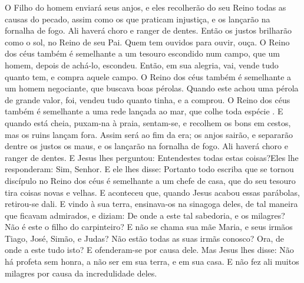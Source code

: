 {  O Filho do homem enviará seus anjos, e eles recolherão do seu Reino todas as causas do pecado,
 assim como os que praticam injustiça,
  e os lançarão na fornalha de fogo. Ali haverá choro e ranger de dentes.
  Então os justos brilharão como o sol, no Reino de seu Pai. Quem tem ouvidos para ouvir, ouça.
  O Reino dos céus também é semelhante a um tesouro escondido num campo, que um homem, depois de achá-lo, escondeu. Então, em sua alegria, vai, vende tudo quanto tem, e compra aquele campo.
  O Reino dos céus também é semelhante a um homem negociante, que buscava boas pérolas.
  Quando este achou uma pérola de grande valor, foi, vendeu tudo quanto tinha, e a comprou.
  O Reino dos céus também é semelhante a uma rede lançada ao mar, que colhe toda espécie
{} .
  E quando está cheia,
{} puxam-na à praia, sentam-se, e recolhem os bons em cestos, mas os ruins lançam fora.
  Assim será ao fim da era; os anjos sairão, e separarão dentre os justos os maus,
  e os lançarão na fornalha de fogo. Ali haverá choro e ranger de dentes.
  E Jesus lhes perguntou: Entendestes todas estas coisas?Eles lhe responderam: Sim, Senhor.
  E ele lhes disse: Portanto todo escriba que se tornou discípulo no Reino dos céus é semelhante a um chefe de casa, que do seu tesouro tira coisas novas e velhas.
  E aconteceu que, quando Jesus acabou essas parábolas, retirou-se dali.
  E vindo à sua terra, ensinava-os na sinagoga deles, de tal maneira que ficavam admirados, e diziam: De onde
{} a este tal sabedoria, e os milagres?
  Não é este o filho do carpinteiro? E não se chama sua mãe Maria, e seus irmãos Tiago, José, Simão, e Judas?
  Não estão todas as suas irmãs conosco? Ora, de onde
{} a este tudo isto?
  E ofenderam-se
 por causa dele. Mas Jesus lhes disse: Não há profeta sem honra, a não ser em sua terra, e em sua casa.
  E não fez ali muitos milagres por causa da incredulidade deles.
\par }

